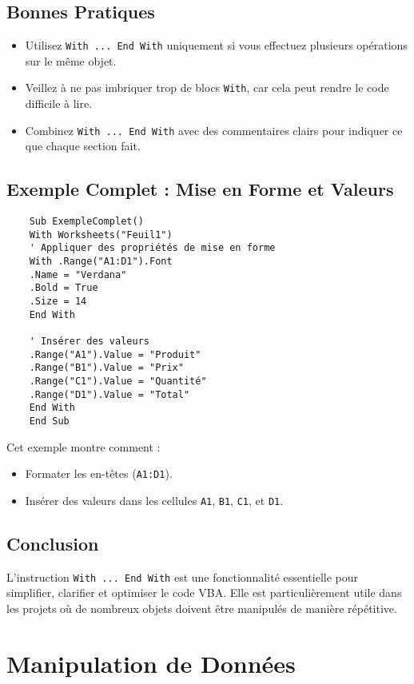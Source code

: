 \documentclass[a4paper,12pt]{report}
\begin{document}
\section{Bonnes Pratiques}
\begin{itemize}
	\item Utilisez \texttt{With ... End With} uniquement si vous effectuez plusieurs opérations sur le même objet.
	\item Veillez à ne pas imbriquer trop de blocs \texttt{With}, car cela peut rendre le code difficile à lire.
	\item Combinez \texttt{With ... End With} avec des commentaires clairs pour indiquer ce que chaque section fait.
\end{itemize}
\newpage
\section{Exemple Complet : Mise en Forme et Valeurs}
\begin{lstlisting}
	Sub ExempleComplet()
	With Worksheets("Feuil1")
	' Appliquer des propriétés de mise en forme
	With .Range("A1:D1").Font
	.Name = "Verdana"
	.Bold = True
	.Size = 14
	End With
	
	' Insérer des valeurs
	.Range("A1").Value = "Produit"
	.Range("B1").Value = "Prix"
	.Range("C1").Value = "Quantité"
	.Range("D1").Value = "Total"
	End With
	End Sub
\end{lstlisting}

Cet exemple montre comment :
\begin{itemize}
	\item Formater les en-têtes (\texttt{A1:D1}).
	\item Insérer des valeurs dans les cellules \texttt{A1}, \texttt{B1}, \texttt{C1}, et \texttt{D1}.
\end{itemize}

\section{Conclusion}
L'instruction \texttt{With ... End With} est une fonctionnalité essentielle pour simplifier, clarifier et optimiser le code VBA. Elle est particulièrement utile dans les projets où de nombreux objets doivent être manipulés de manière répétitive.


\chapter{Manipulation de Données}
\end{document}
